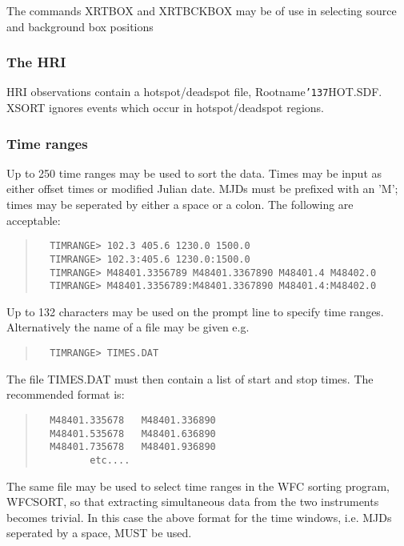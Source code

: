 \documentclass{book}
\renewcommand{\_}{{\tt\char'137}}     %
\begin{document}
The commands XRTBOX and XRTBCKBOX may be of use in selecting source and
background box positions

\subsubsection{The HRI}
HRI observations contain a hotspot/deadspot file, Rootname\_HOT.SDF.
XSORT ignores events which occur in hotspot/deadspot regions.

\subsubsection{Time ranges}
Up to 250 time ranges may be used to sort the data. Times may be input
as either offset times or modified Julian date. MJDs must be prefixed
with an 'M'; times may be seperated by either a space or a colon.
The following are acceptable:

\begin{quote}\begin{verbatim}
  TIMRANGE> 102.3 405.6 1230.0 1500.0
  TIMRANGE> 102.3:405.6 1230.0:1500.0
  TIMRANGE> M48401.3356789 M48401.3367890 M48401.4 M48402.0
  TIMRANGE> M48401.3356789:M48401.3367890 M48401.4:M48402.0
\end{verbatim}\end{quote}
Up to 132 characters may be used on the prompt line to specify time
ranges. Alternatively the name of a file may be given e.g.
\begin{quote}\begin{verbatim}
  TIMRANGE> TIMES.DAT
\end{verbatim}\end{quote}
The file TIMES.DAT must then contain a list of start and stop times.
The recommended format is:
\begin{quote}\begin{verbatim}
  M48401.335678   M48401.336890
  M48401.535678   M48401.636890
  M48401.735678   M48401.936890
         etc....
\end{verbatim}\end{quote}
The same file may be used to select time ranges in the WFC sorting
program, WFCSORT, so that extracting simultaneous data from the
two instruments becomes trivial. In this case the above format for
the time windows, i.e. MJDs seperated by a space, MUST be used.
\end{document}
